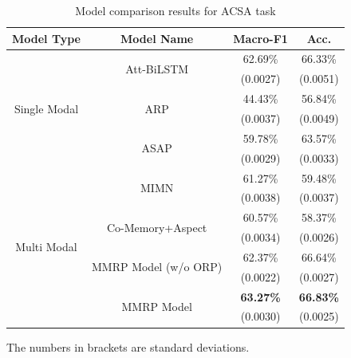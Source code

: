 \documentclass[preprint,12pt]{elsarticle}
\begin{document}
\begin{table}[htp]
	\centering
	\caption{Model comparison results for ACSA task}
	\begin{tabular}{cccc}
		\toprule[1.5pt]
		\multicolumn{1}{l}{Model Type} & \multicolumn{1}{c}{Model Name}                         & Macro-F1 & Acc.  \\ \hline
		\multirow{6}{*}{Single Modal}            & \multirow{2}{*}{Att-BiLSTM}                                   & 62.69\%             & 66.33\%          \\
		&                                                           & (0.0027)          & (0.0051)       \\
		& \multirow{2}{*}{ARP}                                      & 44.43\%             & 56.84\%          \\
		&                                                           & (0.0037)          & (0.0049)       \\
		& \multirow{2}{*}{ASAP}                                     & 59.78\%             & 63.57\%          \\
		&                                                           & (0.0029)          & (0.0033)       \\ \hline
		\multirow{8}{*}{Multi Modal}            & \multirow{2}{*}{MIMN}                                     & 61.27\%             & 59.48\%          \\
		&                                                           & (0.0038)          & (0.0037)       \\
		& \multirow{2}{*}{Co-Memory+Aspect}                         & 60.57\%             & 58.37\%          \\
		&                                                           & (0.0034)          & (0.0026)       \\
		& \multicolumn{1}{l}{\multirow{2}{*}{MMRP Model (w/o ORP)}} & 62.37\%             & 66.64\%          \\
		& \multicolumn{1}{l}{}                                      & (0.0022)          & (0.0027)       \\
		& \multirow{2}{*}{MMRP Model}                              & \textbf{63.27\%}    & \textbf{66.83\%} \\
		&                                                           & (0.0030)          & (0.0025)       \\ \bottomrule[1.5pt]
	\end{tabular}
        
        \begin{tablenotes} %
			\footnotesize
			\item The numbers in brackets are standard deviations. 
		\end{tablenotes}

    
	\label{table:acsa_result}
\end{table}
\end{document}
